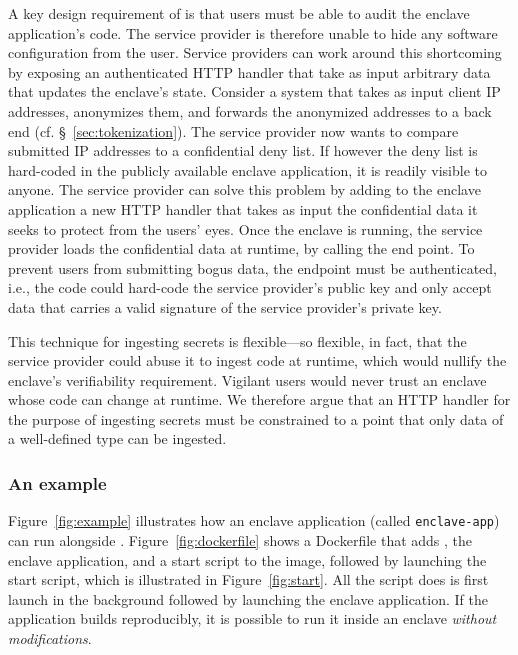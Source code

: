 A key design requirement of \tool{} is that users must be able to audit the
enclave application's code.  The service provider is therefore unable to hide
any software configuration from the user.  Service providers can work around
this shortcoming by exposing an authenticated HTTP handler that take as input
arbitrary data that updates the enclave's state.  Consider a system that takes
as input client IP addresses, anonymizes them, and forwards the anonymized
addresses to a back end (cf. \S~\ref{sec:tokenization}).  The service provider
now wants to compare submitted IP addresses to a confidential deny list.  If
however the deny list is hard-coded in the publicly available enclave
application, it is readily visible to anyone.  The service provider can solve
this problem by adding to the enclave application a new HTTP handler that takes
as input the confidential data it seeks to protect from the users' eyes.  Once
the enclave is running, the service provider loads the confidential data at
runtime, by calling the end point.  To prevent users from submitting bogus data,
the endpoint must be authenticated, i.e., the code could hard-code the service
provider's public key and only accept data that carries a valid signature of the
service provider's private key.

This technique for ingesting secrets is flexible---so flexible, in fact, that
the service provider could abuse it to ingest code at runtime, which would
nullify the enclave's verifiability requirement.  Vigilant users would never
trust an enclave whose code can change at runtime.  We therefore argue that an
HTTP handler for the purpose of ingesting secrets must be constrained to a point
that only data of a well-defined type can be ingested.

\subsubsection{An example}
\label{sec:example}

Figure~\ref{fig:example} illustrates how an enclave application (called
\texttt{enclave-app}) can run alongside \tool{}.  Figure~\ref{fig:dockerfile}
shows a Dockerfile that adds \tool{}, the enclave application, and a start
script to the image, followed by launching the start script, which is
illustrated in Figure~\ref{fig:start}.  All the script does is first launch
\tool{} in the background followed by launching the enclave application.  If
the application builds reproducibly, it is possible to run it inside an enclave
\emph{without modifications}.

